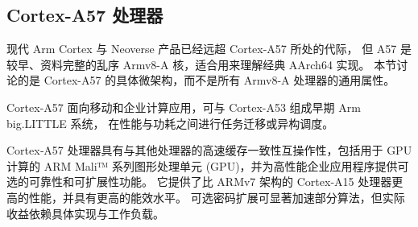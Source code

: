 \subsection{Cortex-A57 处理器}

现代 Arm Cortex 与 Neoverse 产品已经远超 Cortex-A57 所处的代际，
但 A57 是较早、资料完整的乱序 Armv8-A 核，适合用来理解经典 AArch64 实现。
本节讨论的是 Cortex-A57 的具体微架构，而不是所有 Armv8-A 处理器的通用属性。

Cortex-A57 面向移动和企业计算应用，可与 Cortex-A53 组成早期 Arm big.LITTLE 系统，
在性能与功耗之间进行任务迁移或异构调度。

Cortex‑A57 处理器具有与其他处理器的高速缓存一致性互操作性，包括用于 GPU 计算的 ARM Mali™ 系列图形处理单元 (GPU)，并为高性能企业应用程序提供可选的可靠性和可扩展性功能。
它提供了比 ARMv7 架构的 Cortex‑A15 处理器更高的性能，并具有更高的能效水平。
可选密码扩展可显著加速部分算法，但实际收益依赖具体实现与工作负载。

